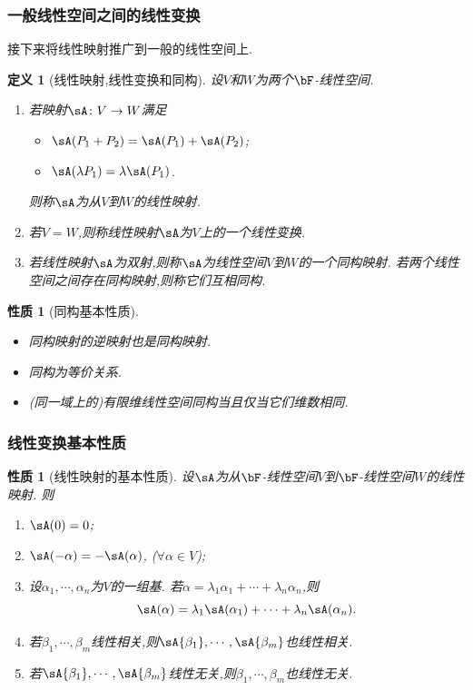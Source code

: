 \documentclass{article}
\newtheorem{proposition}[theorem]{性质}  %
\newtheorem{definition}[theorem]{定义}
\renewcommand{\blue }[1]{{\textcolor[rgb]{0,0,1}{#1}}}
\begin{document}
\subsubsection{一般线性空间之间的线性变换}
接下来将线性映射推广到一般的线性空间上.
\begin{definition}[线性映射,线性变换和同构]
设$V$和$W$为两个$\bF$-线性空间.
\begin{enumerate}
\item 若映射$\sA\colon V\rightarrow W$满足
\begin{itemize}
\item  $\sA(P_1 + P_2) = \sA( P_1) + \sA(P_2)$;
\item  $\sA(\lambda P_1) = \lambda\sA( P_1)$.
\end{itemize}
则称$\sA$为从$V$到$W$的\blue{线性映射}.
\item 若$V=W$,则称线性映射$\sA$为$V$上的一个\blue{线性变换}.
\item 若线性映射$\sA$为双射,则称$\sA$为线性空间$V$到$W$的一个\blue{同构映射}. 若两个线性空间之间存在同构映射,则称它们互相\blue{同构}.
\end{enumerate}
\end{definition}
\begin{proposition}[同构基本性质]
\begin{itemize}
\item 同构映射的逆映射也是同构映射.
\item 同构为等价关系.
\item (同一域上的)有限维线性空间同构当且仅当它们维数相同.
\end{itemize}
\end{proposition}

\subsubsection{线性变换基本性质}
\begin{proposition}[线性映射的基本性质]
设$\sA$为从$\bF$-线性空间$V$到$\bF$-线性空间$W$的线性映射.
则
\begin{enumerate}
\item $\sA(0)=0$;
\item $\sA(-\alpha) = -\sA(\alpha)$, ($\forall \alpha\in V$);
\item 设$\alpha_1,\cdots,\alpha_n$为$V$的一组基. 若$\alpha = \lambda_1\alpha_1 + \cdots + \lambda_n\alpha_n$,则
\[\sA(\alpha) = \lambda_1\sA(\alpha_1) + \cdots + \lambda_n\sA(\alpha_n).\]
\item 若$\beta_1,\cdots,\beta_m$线性相关,则$\sA{\beta_1},\cdots,\sA{\beta_m}$也线性相关.
\item 若$\sA{\beta_1},\cdots,\sA{\beta_m}$线性无关,则$\beta_1,\cdots,\beta_m$也线性无关.
\end{enumerate}
\end{proposition}
\end{document}
